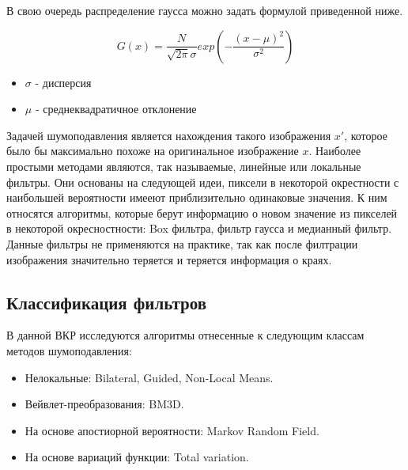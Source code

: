В свою очередь распределение гаусса можно задать формулой приведенной ниже.

\begin{equation}\label{eGaussNoise}
	G(x)=\frac{N}{\sqrt{2\pi}\sigma}exp(-\frac{(x-\mu)^2}{\sigma^2})	
\end{equation}
\begin{itemize}
	\item $\sigma$ - дисперсия 
	\item $\mu$ - среднеквадратичное отклонение
\end{itemize}

Задачей шумоподавления является нахождения такого изображения $x'$, которое было бы максимально похоже на оригинальное изображение $x$. 
Наиболее простыми методами являются, так называемые, линейные или локальные фильтры. Они основаны на следующей идеи, пиксели в некоторой окрестности с наибольшей вероятности имееют приблизительно одинаковые значения. К ним относятся алгоритмы, которые берут информацию о новом значение из пикселей в некоторой окресностности: Box фильтра, фильтр гаусса и медианный фильтр. Данные фильтры не применяются на практике, так как после филтрации изображения значительно теряется и теряется информация о краях.

\subsection{Классификация фильтров}
В данной ВКР исследуются алгоритмы отнесенные к следующим классам методов шумоподавления:
\begin{itemize}
	\item Нелокальные: Bilateral, Guided, Non-Local Means.
	\item Вейвлет-преобразования: BM3D.
	\item На основе апостиорной вероятности: Markov Random Field.
	\item На основе вариаций функции: Total variation.
\end{itemize}

